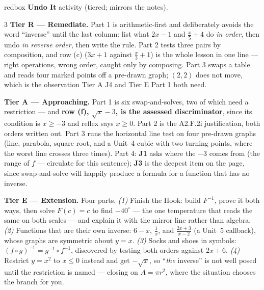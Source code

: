 \documentclass[10pt]{article}
\begin{document}
\begin{skillbox}{redbox}
\textbf{Undo It} activity (tiered; mirrors the notes).
\begin{multicols}{3}
\textbf{Tier R --- Remediate.} Part 1 is arithmetic-first and deliberately avoids the word
``inverse'' until the last column: list what $2x-1$ and $\frac{x}{5}+4$ do \emph{in order}, then undo
\emph{in reverse order}, then write the rule. Part 2 tests three pairs by composition, and row (c)
($3x+1$ against $\frac{x}{3}+1$) is the whole lesson in one line --- right operations, wrong order,
caught only by composing. Part 3 swaps a table and reads four marked points off a pre-drawn graph;
$(2,2)$ does not move, which is the observation Tier A J4 and Tier E Part 1 both need.

\columnbreak
\textbf{Tier A --- Approaching.} Part 1 is six swap-and-solves, two of which need a restriction ---
and \textbf{row (f), $\sqrt{x}-3$, is the assessed discriminator}, since its condition is $x\ge-3$
and reflex says $x\ge0$. Part 2 is the A2.F.2i justification, both orders written out. Part 3 runs
the horizontal line test on four pre-drawn graphs (line, parabola, square root, and a Unit~4 cubic
with two turning points, where the worst line crosses three times). Part 4: \textbf{J1} asks where
the $-3$ comes from (the range of $f$ --- circulate for this sentence); \textbf{J3} is the deepest
item on the page, since swap-and-solve will happily produce a formula for a function that has no
inverse.

\columnbreak
\textbf{Tier E --- Extension.} Four parts. \emph{(1)} Finish the Hook: build $F^{-1}$, prove it both
ways, then solve $F(c)=c$ to find $-40^{\circ}$ --- the one temperature that reads the same on both
scales --- and explain it with the mirror line rather than algebra. \emph{(2)} Functions that are
their own inverse: $6-x$, $\frac1x$, and $\frac{2x+3}{x-2}$ (a Unit~5 callback), whose graphs are
symmetric about $y=x$. \emph{(3)} Socks and shoes in symbols: $(f\circ g)^{-1}=g^{-1}\circ f^{-1}$,
discovered by testing both orders against $2x+6$. \emph{(4)} Restrict $y=x^{2}$ to $x\le0$ instead
and get $-\sqrt{x}$, so ``\emph{the} inverse'' is not well posed until the restriction is named ---
closing on $A=\pi r^{2}$, where the situation chooses the branch for you.
\end{multicols}
\end{skillbox}
\end{document}
